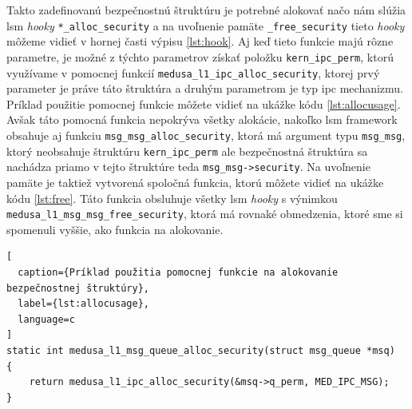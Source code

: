 Takto zadefinovanú bezpečnostnú štruktúru je potrebné alokovať načo nám slúžia \acrshort{lsm} \textit{hooky} \texttt{*\_alloc\_security} a na uvoľnenie pamäte \texttt{\_free\_security} tieto \textit{hooky} môžeme vidieť v hornej časti výpisu \ref{lst:hook}. Aj keď tieto funkcie majú rôzne parametre, je možné z týchto parametrov získať položku \texttt{kern\_ipc\_perm}, ktorú využívame v pomocnej funkcií \texttt{medusa\_l1\_ipc\_alloc\_security}, ktorej prvý parameter je práve táto štruktúra a druhým parametrom je typ \acrshort{ipc} mechanizmu. Príklad použitie pomocnej funkcie môžete vidieť na ukážke kódu \ref{lst:allocusage}. Avšak táto pomocná funkcia nepokrýva všetky alokácie, nakoľko \acrshort{lsm} framework obsahuje aj funkciu \texttt{msg\_msg\_alloc\_security}, ktorá má argument typu \texttt{msg\_msg}, ktorý neobsahuje štruktúru \texttt{kern\_ipc\_perm} ale bezpečnostná štruktúra sa nachádza priamo v tejto štruktúre teda \texttt{msg\_msg->security}. Na uvoľnenie pamäte je taktiež vytvorená spoločná funkcia, ktorú môžete vidieť na ukážke kódu \ref{lst:free}. Táto funkcia obsluhuje všetky \acrshort{lsm} \textit{hooky} s výnimkou \texttt{medusa\_l1\_msg\_msg\_free\_security}, ktorá má rovnaké obmedzenia, ktoré sme si spomenuli vyššie, ako funkcia na alokovanie.
\begin{lstlisting}[
  caption={Príklad použitia pomocnej funkcie na alokovanie bezpečnostnej štruktúry},
  label={lst:allocusage},
  language=c
]
static int medusa_l1_msg_queue_alloc_security(struct msg_queue *msq)
{
	return medusa_l1_ipc_alloc_security(&msq->q_perm, MED_IPC_MSG);
}
\end{lstlisting} 

